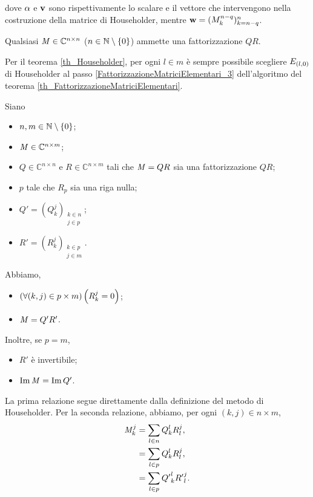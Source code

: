 dove $\alpha$ e $\mathbf{v}$ sono rispettivamente lo scalare e il vettore che intervengono
nella costruzione della matrice di Householder, mentre
$\mathbf{w} = (M_k^{n - q})_{k = n - q}^n$.
\begin{Corollary}
  Qualsiasi $\mathit{M} \in \mathbb{C}^{n \times n}$ ($n \in \mathbb{N} \setminus \lbrace 0 \rbrace$) ammette una
  fattorizzazione $QR$.
\end{Corollary}
\Proof Per il teorema \ref{th_Householder}, per ogni $l \in m$ \`e sempre possibile scegliere
$E_{(l,0)}$ di Householder al passo \ref{FattorizzazioneMatriciElementari_3}
dell'algoritmo del teorema \ref{th_FattorizzazioneMatriciElementari}. \EndProof
\begin{Theorem}
  \label{th_OrtonormalizzazioneQR}
  Siano
  \begin{itemize}
    \item $n, m \in \mathbb{N} \setminus \lbrace 0 \rbrace$;
    \item $\mathit{M} \in \mathbb{C}^{n \times m}$;
    \item $Q \in \mathbb{C}^{n \times n}$ e $R \in \mathbb{C}^{n \times m}$
      tali che $\mathit{M} = QR$ sia una fattorizzazione $QR$;
    \item $p$ tale che $R_p$ sia una riga nulla;
    \item $Q' = (Q_k^j)_{\substack{k \in n\\j \in p}}$;
    \item $R' = (R_k^j)_{\substack{k \in p\\j \in m}}$.
  \end{itemize}
  Abbiamo,
  \begin{itemize}
    \item $\left ( \forall (k,j) \in p \times m \right ) \left ( R_k^j = 0 \right )$;
    \item $\mathit{M} = Q'R'$.
  \end{itemize}
  Inoltre, se $p = m$,
  \begin{itemize}
    \item $R'$ \`e invertibile;
    \item $\operatorname{Im}{\mathit{M}} = \operatorname{Im}{Q'}$.
  \end{itemize}
\end{Theorem}
\Proof La prima relazione segue direttamente dalla definizione del metodo
di Householder. Per la seconda relazione, abbiamo, per ogni
$(k,j) \in n \times m$,
\begin{align*}
  \mathit{M}_k^j
  &= \sum_{l \in n} Q_k^l R_l^j,\\
  &= \sum_{l \in p} Q_k^l R_l^j,\\
  &= \sum_{l \in p} {Q'}_k^l {R'}_l^j.
\end{align*}
